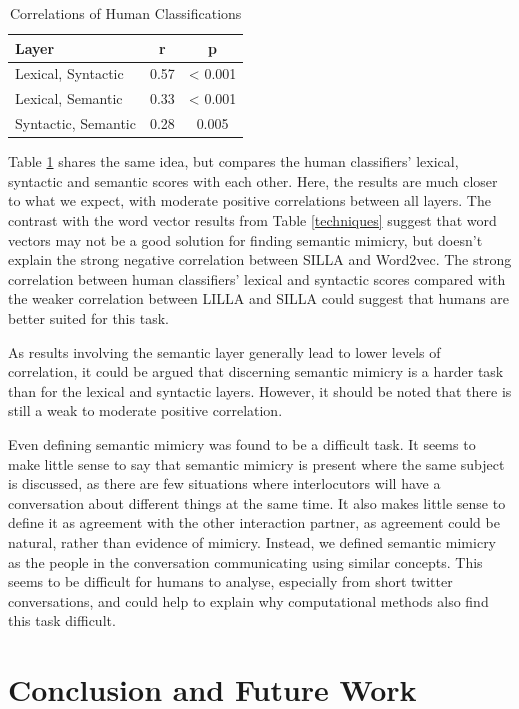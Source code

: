 \documentclass[conference]{IEEEtran}
\begin{document}
\begin{table}[!t]
\caption{Correlations of Human Classifications}
\label{classifications}
\centering
\renewcommand{\arraystretch}{1.2}
\begin{tabular}{l c c}
Layer & r & p \\
\hline
Lexical, Syntactic & 0.57 & < 0.001 \\
Lexical, Semantic & 0.33 & < 0.001 \\
Syntactic, Semantic & 0.28 & 0.005
\end{tabular}
\end{table}

Table \ref{classifications} shares the same idea, but compares the human classifiers' lexical, syntactic and semantic scores with each other. Here, the results are much closer to what we expect, with moderate positive correlations between all layers. The contrast with the word vector results from Table \ref{techniques} suggest that word vectors may not be a good solution for finding semantic mimicry, but doesn't explain the strong negative correlation between SILLA and Word2vec. The strong correlation between human classifiers' lexical and syntactic scores compared with the weaker correlation between LILLA and SILLA could suggest that humans are better suited for this task.

As results involving the semantic layer generally lead to lower levels of correlation, it could be argued that discerning semantic mimicry is a harder task than for the lexical and syntactic layers. However, it should be noted that there is still a weak to moderate positive correlation.

Even defining semantic mimicry was found to be a difficult task. It seems to make little sense to say that semantic mimicry is present where the same subject is discussed, as there are few situations where interlocutors will have a conversation about different things at the same time. It also makes little sense to define it as agreement with the other interaction partner, as agreement could be natural, rather than evidence of mimicry. Instead, we defined semantic mimicry as the people in the conversation communicating using similar concepts. This seems to be difficult for humans to analyse, especially from short twitter conversations, and could help to explain why computational methods also find this task difficult.


\section{Conclusion and Future Work}
\end{document}
